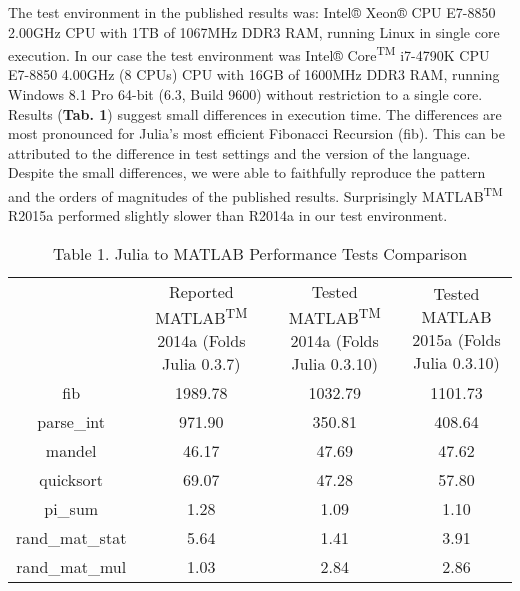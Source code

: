 The test environment in the published results was: Intel® Xeon® CPU E7-8850 2.00GHz CPU with 1TB of 1067MHz DDR3 RAM, running Linux in single core execution. In our case the test environment was Intel® Core\textsuperscript{TM} i7-4790K CPU E7-8850 4.00GHz (8 CPUs) CPU with 16GB of 1600MHz DDR3 RAM, running Windows 8.1 Pro 64-bit (6.3, Build 9600) without restriction to a single core. Results (\textbf{Tab. 1}) suggest small differences in execution time. The differences are most pronounced for Julia's most efficient Fibonacci Recursion (fib). This can be attributed to the difference in test settings and the version of the language. Despite the small differences, we were able to faithfully reproduce the pattern and the orders of magnitudes of the published results. Surprisingly MATLAB\textsuperscript{TM} R2015a performed slightly slower than R2014a in our test environment.

\begin{table} 
    \begin{tabular}{ c c c c }
         & Reported MATLAB\textsuperscript{TM} 2014a (Folds Julia 0.3.7) & Tested MATLAB\textsuperscript{TM} 2014a (Folds Julia 0.3.10) & Tested MATLAB 2015a (Folds Julia 0.3.10) \\ 
        fib & 1989.78 & 1032.79 & 1101.73 \\ 
        parse\_int & 971.90 & 350.81 & 408.64 \\ 
        mandel & 46.17 & 47.69 & 47.62 \\ 
        quicksort & 69.07 & 47.28 & 57.80 \\ 
        pi\_sum & 1.28 & 1.09 & 1.10 \\ 
        rand\_mat\_stat & 5.64 & 1.41 & 3.91 \\ 
        rand\_mat\_mul & 1.03 & 2.84 & 2.86 \\ 
    \end{tabular}
    \caption{Table 1. Julia to MATLAB Performance Tests Comparison}
\end{table}

  
  
  
  
  
  
  
  
  
  
  
  
  
  
  
  
  
  
  
  
  
  
  
  
  
  
  
  
  